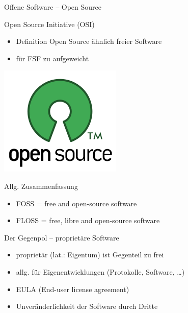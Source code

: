 \documentclass[aspectratio=43]{beamer}
\begin{document}
\begin{frame}{Offene Software -- Open Source}
  \begin{block}{Open Source Initiative (OSI)}
    \begin{itemize}
      \item Definition Open Source ähnlich freier Software
      \item für FSF zu aufgeweicht
    \end{itemize}
    \flushright \includegraphics[width=.12\textwidth]{pix/osi-logo}
  \end{block}
  \begin{block}{Allg. Zusammenfassung}
    \begin{itemize}
      \item FOSS = free and open-source software
      \item FLOSS = free, libre and open-source software
    \end{itemize}
  \end{block}
\end{frame}

\begin{frame}{}
  \begin{block}{Der Gegenpol -- proprietäre Software}
    \begin{itemize}
      \item proprietär (lat.: Eigentum) ist Gegenteil zu frei
      \item allg. für Eigenentwicklungen (Protokolle, Software, \dots)
      \item EULA (End-user license agreement)
      \item Unveränderlichkeit der Software durch Dritte
    \end{itemize}
  \end{block}
\end{frame}
\end{document}
